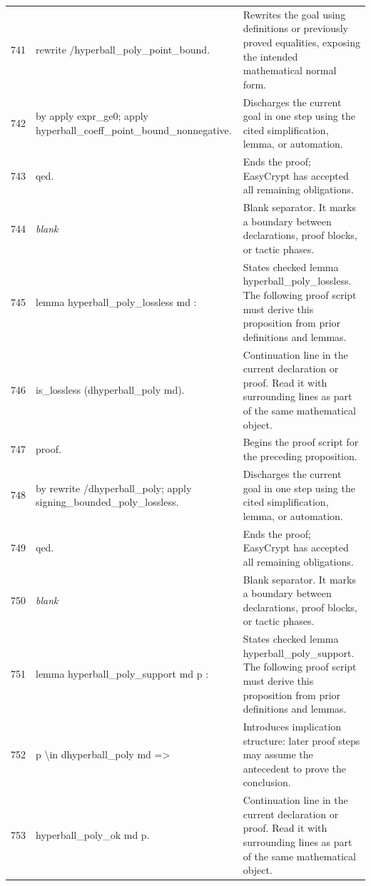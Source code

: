 \documentclass[10pt]{article}
\begin{document}
\begin{longtable}{r L{0.53\textwidth} L{0.37\textwidth}}
741 & {\ttfamily\scriptsize rewrite /hyperball\_poly\_point\_bound.} & Rewrites the goal using definitions or previously proved equalities, exposing the intended mathematical normal form. \\
742 & {\ttfamily\scriptsize by apply expr\_ge0; apply hyperball\_coeff\_point\_bound\_nonnegative.} & Discharges the current goal in one step using the cited simplification, lemma, or automation. \\
743 & {\ttfamily\scriptsize qed.} & Ends the proof; EasyCrypt has accepted all remaining obligations. \\
744 & {\ttfamily\scriptsize \emph{blank}} & Blank separator.  It marks a boundary between declarations, proof blocks, or tactic phases. \\
745 & {\ttfamily\scriptsize lemma hyperball\_poly\_lossless md :} & States checked lemma hyperball\_poly\_lossless.  The following proof script must derive this proposition from prior definitions and lemmas. \\
746 & {\ttfamily\scriptsize   is\_lossless (dhyperball\_poly md).} & Continuation line in the current declaration or proof.  Read it with surrounding lines as part of the same mathematical object. \\
747 & {\ttfamily\scriptsize proof.} & Begins the proof script for the preceding proposition. \\
748 & {\ttfamily\scriptsize by rewrite /dhyperball\_poly; apply signing\_bounded\_poly\_lossless.} & Discharges the current goal in one step using the cited simplification, lemma, or automation. \\
749 & {\ttfamily\scriptsize qed.} & Ends the proof; EasyCrypt has accepted all remaining obligations. \\
750 & {\ttfamily\scriptsize \emph{blank}} & Blank separator.  It marks a boundary between declarations, proof blocks, or tactic phases. \\
751 & {\ttfamily\scriptsize lemma hyperball\_poly\_support md p :} & States checked lemma hyperball\_poly\_support.  The following proof script must derive this proposition from prior definitions and lemmas. \\
752 & {\ttfamily\scriptsize   p \textbackslash{}in dhyperball\_poly md =>} & Introduces implication structure: later proof steps may assume the antecedent to prove the conclusion. \\
753 & {\ttfamily\scriptsize   hyperball\_poly\_ok md p.} & Continuation line in the current declaration or proof.  Read it with surrounding lines as part of the same mathematical object. \\

\end{longtable}
\end{document}
